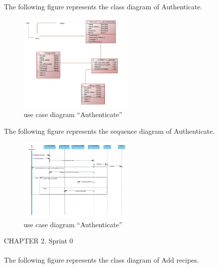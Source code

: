 \documentclass{article}
\begin{document}
{{{The following figure represents the class diagram of Authenticate.\\







\begin{figure}[htbp]
    \centering
    \includegraphics[width=0.5\textwidth]{DiagAuth}
    \caption{use case diagram “Authenticate”}
    \label{fig:design2}
\end{figure}
The following figure represents the sequence diagram of Authenticate.\\
\begin{figure}[htbp]
    \centering
    \includegraphics[width=0.5\textwidth]{SeqAuth}
    \caption{use case diagram “Authenticate”}
    \label{fig:design2}
\end{figure}
\newpage
\noindent
CHAPTER 2.  Sprint 0 \\
\underline{\hspace{\textwidth}} \vspace{0.2cm}\\
The following figure represents the class diagram of Add recipes.\\

}}}
\end{document}

